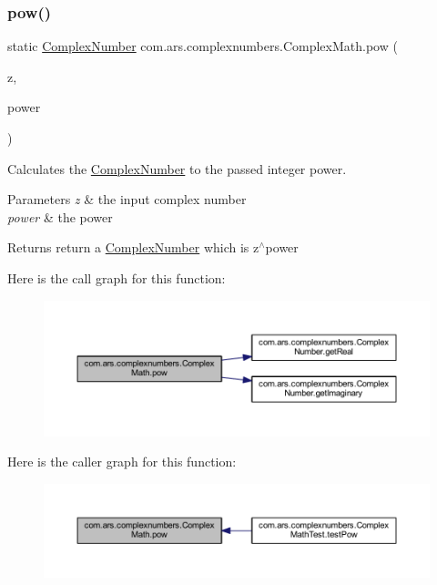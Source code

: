\subsubsection{\texorpdfstring{pow()}{pow()}}
{\footnotesize\ttfamily static \hyperlink{classcom_1_1ars_1_1complexnumbers_1_1_complex_number}{Complex\+Number} com.\+ars.\+complexnumbers.\+Complex\+Math.\+pow (\begin{DoxyParamCaption}\item[{\hyperlink{classcom_1_1ars_1_1complexnumbers_1_1_complex_number}{Complex\+Number}}]{z,  }\item[{int}]{power }\end{DoxyParamCaption})\hspace{0.3cm}{\ttfamily [static]}}

Calculates the {\ttfamily \hyperlink{classcom_1_1ars_1_1complexnumbers_1_1_complex_number}{Complex\+Number}} to the passed integer power. 
\begin{DoxyParams}{Parameters}
{\em z} & the input complex number \\
\hline
{\em power} & the power \\
\hline
\end{DoxyParams}
\begin{DoxyReturn}{Returns}
return a {\ttfamily \hyperlink{classcom_1_1ars_1_1complexnumbers_1_1_complex_number}{Complex\+Number}} which is z$^\wedge$power 
\end{DoxyReturn}
Here is the call graph for this function\+:
\nopagebreak
\begin{figure}[H]
\begin{center}
\leavevmode
\includegraphics[width=350pt]{classcom_1_1ars_1_1complexnumbers_1_1_complex_math_a0e31bcd8237beabdee3f1480e8667d83_cgraph}
\end{center}
\end{figure}
Here is the caller graph for this function\+:
\nopagebreak
\begin{figure}[H]
\begin{center}
\leavevmode
\includegraphics[width=350pt]{classcom_1_1ars_1_1complexnumbers_1_1_complex_math_a0e31bcd8237beabdee3f1480e8667d83_icgraph}
\end{center}
\end{figure}
